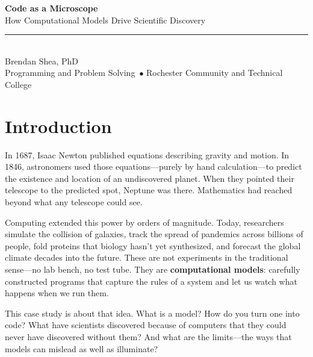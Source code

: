 \documentclass[11pt,letterpaper]{article}
\newcommand{\cstitle}{Code as a Microscope}
\newcommand{\cssubtitle}{How Computational Models Drive Scientific Discovery}
\newcommand{\csauthor}{Brendan Shea, PhD}
\newcommand{\cscourse}{Programming and Problem Solving}
\newcommand{\csinstitution}{Rochester Community and Technical College}
\newcommand{\keyterm}[1]{\textbf{\textcolor{cssecondary}{#1}}}
\begin{document}
\begin{tcolorbox}[
    enhanced,
    colback=csprimary,
    colframe=csprimary,
    arc=0mm,
    left=10mm, right=10mm, top=8mm, bottom=8mm
]
\begin{center}
    {\huge\bfseries\color{white}\cstitle}\\[3mm]
    {\Large\color{cslight}\cssubtitle}\\[5mm]
    \textcolor{cssecondary}{\rule{0.5\textwidth}{1pt}}\\[5mm]
    {\large\color{white}\csauthor}\\[2mm]
    {\normalsize\color{cslight}\cscourse\ $\bullet$ \csinstitution}
\end{center}
\end{tcolorbox}

\vspace{5mm}

\section*{Introduction}

In 1687, Isaac Newton published equations describing gravity and motion. In 1846, astronomers used those equations---purely by hand calculation---to predict the existence and location of an undiscovered planet. When they pointed their telescope to the predicted spot, Neptune was there. Mathematics had reached beyond what any telescope could see.

Computing extended this power by orders of magnitude. Today, researchers simulate the collision of galaxies, track the spread of pandemics across billions of people, fold proteins that biology hasn't yet synthesized, and forecast the global climate decades into the future. These are not experiments in the traditional sense---no lab bench, no test tube. They are \keyterm{computational models}: carefully constructed programs that capture the rules of a system and let us watch what happens when we run them.

This case study is about that idea. What is a model? How do you turn one into code? What have scientists discovered because of computers that they could never have discovered without them? And what are the limits---the ways that models can mislead as well as illuminate?
\end{document}
